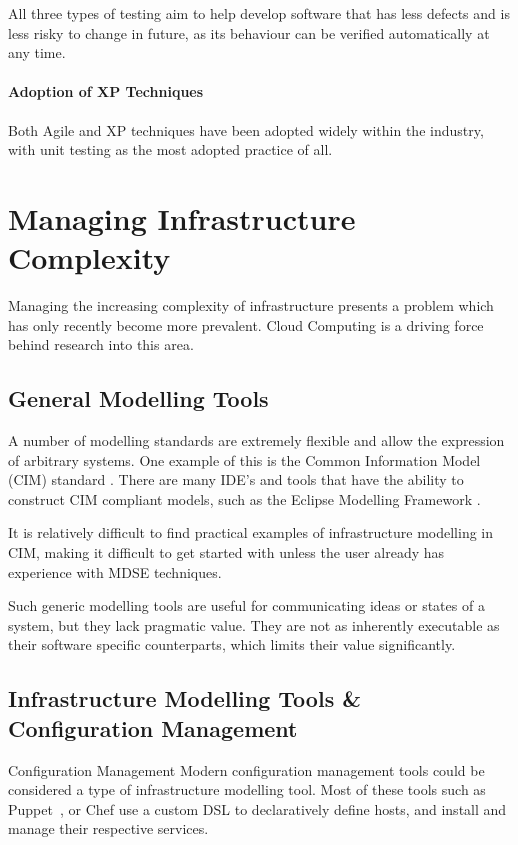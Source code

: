 \documentclass{cshonours}
\begin{document}
All three types of testing aim to help develop software that has less defects and is less risky to change in future, as its behaviour can be verified automatically at any time.

\paragraph{Adoption of XP Techniques}

Both Agile and XP techniques have been adopted widely within the industry, with unit testing as the most adopted practice of all.

\pagebreak
\section{Managing Infrastructure Complexity}

Managing the increasing complexity of infrastructure presents a problem which has only recently become more prevalent. Cloud Computing is a driving force behind research into this area.

\subsection{General Modelling Tools}

A number of modelling standards are extremely flexible and allow the expression of arbitrary systems. One example of this is the Common Information Model (CIM) standard \cite{CIM}. There are many IDE’s and tools that have the ability to construct CIM compliant models, such as the Eclipse Modelling Framework \cite{EMF}.

It is relatively difficult to find practical examples of infrastructure modelling in CIM, making it difficult to get started with unless the user already has experience with MDSE techniques.

Such generic modelling tools are useful for communicating ideas or states of a system, but they lack pragmatic value. They are not as inherently executable as their software specific counterparts, which limits their value significantly.

\subsection{Infrastructure Modelling Tools \& Configuration Management}

Configuration Management
Modern configuration management tools could be considered a type of infrastructure modelling tool. Most of these tools such as Puppet~\cite{Puppet}, or Chef\cite{Chef} use a custom DSL to declaratively define hosts, and install and manage their respective services.
\end{document}

